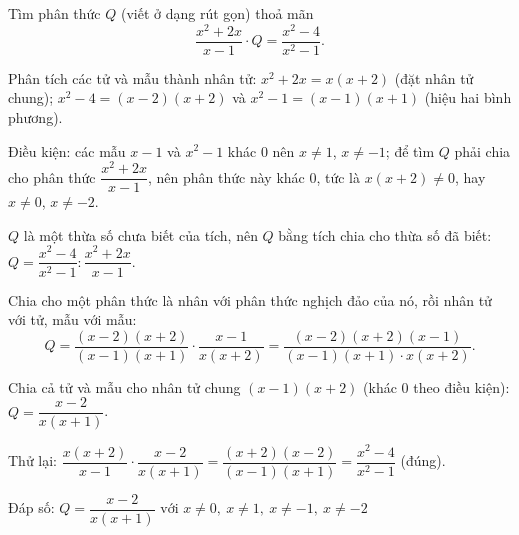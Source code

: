 \begin{problem}[8DS-PS-026]
Tìm phân thức $Q$ (viết ở dạng rút gọn) thoả mãn
\[ \dfrac{x^2 + 2x}{x - 1} \cdot Q = \dfrac{x^2 - 4}{x^2 - 1}. \]

\begin{solution}
Phân tích các tử và mẫu thành nhân tử: $x^2 + 2x = x(x + 2)$ (đặt nhân tử chung); $x^2 - 4 = (x - 2)(x + 2)$ và $x^2 - 1 = (x - 1)(x + 1)$ (hiệu hai bình phương).

Điều kiện: các mẫu $x - 1$ và $x^2 - 1$ khác $0$ nên $x \neq 1$, $x \neq -1$; để tìm $Q$ phải chia cho phân thức $\dfrac{x^2 + 2x}{x - 1}$, nên phân thức này khác $0$, tức là $x(x + 2) \neq 0$, hay $x \neq 0$, $x \neq -2$.

$Q$ là một thừa số chưa biết của tích, nên $Q$ bằng tích chia cho thừa số đã biết: $Q = \dfrac{x^2 - 4}{x^2 - 1} : \dfrac{x^2 + 2x}{x - 1}$.

Chia cho một phân thức là nhân với phân thức nghịch đảo của nó, rồi nhân tử với tử, mẫu với mẫu:
\[ Q = \dfrac{(x - 2)(x + 2)}{(x - 1)(x + 1)} \cdot \dfrac{x - 1}{x(x + 2)} = \dfrac{(x - 2)(x + 2)(x - 1)}{(x - 1)(x + 1) \cdot x(x + 2)}. \]

Chia cả tử và mẫu cho nhân tử chung $(x - 1)(x + 2)$ (khác $0$ theo điều kiện): $Q = \dfrac{x - 2}{x(x + 1)}$.

Thử lại: $\dfrac{x(x + 2)}{x - 1} \cdot \dfrac{x - 2}{x(x + 1)} = \dfrac{(x + 2)(x - 2)}{(x - 1)(x + 1)} = \dfrac{x^2 - 4}{x^2 - 1}$ (đúng).

Đáp số: $\boxed{Q = \dfrac{x - 2}{x(x + 1)} \text{ với } x \neq 0,\ x \neq 1,\ x \neq -1,\ x \neq -2}$
\end{solution}
\end{problem}

